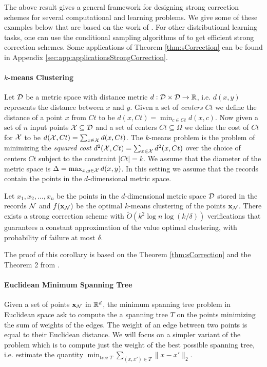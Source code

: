   The above result gives a general framework for designing strong correction schemes for several computational and learning 
problems. We give some of these examples below that are based on the work of \cite{GouleakisTZ2017}. For other distributional 
learning tasks, one can use the conditional sampling algorithms of \cite{CanonneRS14} to get efficient strong correction 
schemes. Some applications of Theorem \ref{thm:sCorrection} can be found in Appendix \ref{sec:app:applicationsStrongCorrection}.
\paragraph{$k$-means Clustering}
  Let $\mathcal{D}$ be a metric space with distance metric $d : \mathcal{D} \times \mathcal{D} \rightarrow \mathbb{R}$, i.e. $d(x, y)$ 
represents the distance between $x$ and $y$. Given a set of \textit{centers} $Ct$ we define the distance of a point $x$ from 
$Ct$ to be $d(x, Ct) = \min_{c \in Ct} d(x, c)$. Now given a set of $n$ input points $\mathcal{X} \subseteq \mathcal{D}$ and a set of 
centers $Ct \subseteq \Omega$ we define the cost of $Ct$ for $\mathcal{X}$ to be 
$d(\mathcal{X}, Ct) = \sum_{x \in \mathcal{X}} d(x, Ct)$. The $k$-means problem is the problem of minimizing the 
\textit{squared cost} $d^2(\mathcal{X}, Ct) = \sum_{x \in \mathcal{X}} d^2(x, Ct)$ over the choice of centers $Ct$ subject to the 
constraint $|Ct| = k$. We assume that the diameter of the metric space is $\Delta = \max_{x, y \in \mathcal{X}} d(x, y)$. In this 
setting we assume that the records contain the points in the $d$-dimensional metric space.

\begin{corollary} \label{cor:kmeans}
    Let $x_1, x_2, \dots, x_n$ be the points in the $d$-dimensional metric space $\mathcal{D}$ stored in the records $\mathcal{N}$
  and $f(\mathbf{x}_{\mathcal{N}})$ be the optimal $k$-means clustering of the points $\mathbf{x}_{\mathcal{N}}$. There exists a strong correction scheme with 
  $\tilde{O}(k^2 \log n \log ( k / \delta ))$ verifications that guarantees a constant approximation of the value optimal 
  clustering, with probability of failure at most $\delta$.
\end{corollary}

  The proof of this corollary is based on the Theorem \ref{thm:sCorrection} and the Theorem 2 from \cite{GouleakisTZ2017}.

\paragraph{Euclidean Minimum Spanning Tree}
  Given a set of points $\mathbf{x}_{\mathcal{N}}$ in $\mathbb{R}^d$, the minimum spanning tree problem in Euclidean space ask to compute the a spanning
tree $T$ on the points minimizing the sum of weights of the edges. The weight of an edge between two points is equal to their 
Euclidean distance. We will focus on a simpler variant of the problem which is to compute just the weight of the best possible 
spanning tree, i.e. estimate the quantity
$\min_{\text{tree } T} \sum_{(x,x') \in T} \|x - x'\|_2$.

